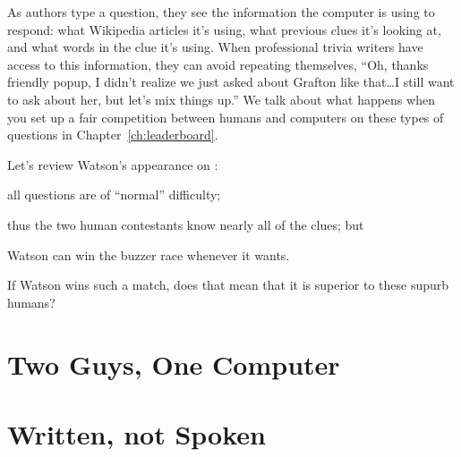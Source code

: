 As authors type a question, they see the information the computer is
using to respond:
%
what Wikipedia articles it's using,
%
what previous clues it's looking at,
%
and what words in the clue it's using.
%
When professional trivia writers have access to this information, they can
avoid repeating themselves,
%
``Oh, thanks friendly popup, I didn't realize we just asked about
Grafton like that\dots I still want to ask about her, but let's mix
things up.''
%
We talk about what happens when you set up a fair competition between
humans and computers on these types of questions in
Chapter~\ref{ch:leaderboard}.

Let's review Watson's appearance on \jeopardyp{}:
\begin{enumerate*}
        \item all questions are of ``normal'' difficulty;
        \item thus the two human contestants know nearly all of the clues; but
        \item Watson can win the buzzer race whenever it wants.
\end{enumerate*}
If Watson wins such a match, does that mean that it is superior to
these supurb humans?

\section{Two Guys, One Computer}



\section{Written, not Spoken}

\section{}
